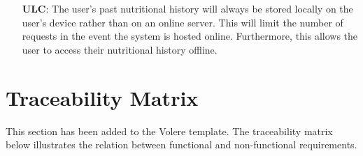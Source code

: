 \documentclass[12pt]{article}
\newcounter{lcnum} %
\newcounter{ulcnum} %
\begin{document}
\noindent \begin{itemize}

\item[\textbf{ULC\refstepcounter{ulcnum}\theulcnum\label{ULC_meaningfulLabel}}:] 
The user's past nutritional history will always be stored locally on the user's 
device rather than on an online server. This will limit the number of requests in the event the system 
is hosted online. Furthermore, this allows the user to access their nutritional history 
offline.

\end{itemize}

\section{Traceability Matrix}
This section has been added to the Volere template. The traceability matrix below illustrates the relation between functional and non-functional requirements.
\end{document}

